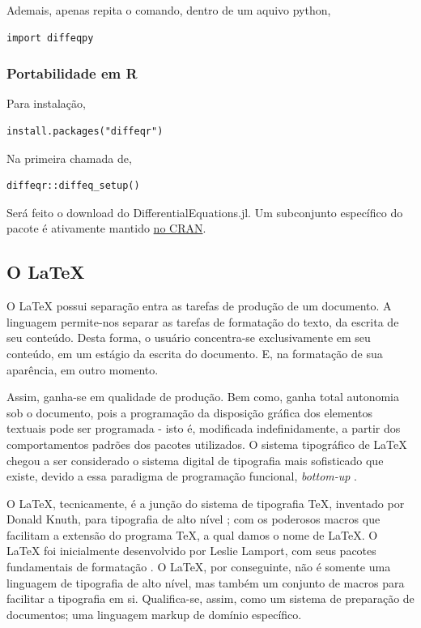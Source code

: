 \documentclass[
12pt,				%
openright,			%
oneside,			%
a4paper,			%
english,			%
french,				%
spanish,			%
brazil,				%
]{abntex2}
\begin{document}
Ademais, apenas repita o comando, dentro de um aquivo python,

\begin{verbatim}
import diffeqpy
\end{verbatim}

\subsubsection{Portabilidade em R}

Para instalação,
\begin{verbatim}
install.packages("diffeqr")
\end{verbatim}

Na primeira chamada de,
\begin{verbatim}
diffeqr::diffeq_setup()
\end{verbatim}

Será feito o download do DifferentialEquations.jl. Um subconjunto específico do pacote é ativamente mantido \href{https://cran.r-project.org/web/packages/diffeqr/index.html}{no CRAN}.

\subsection{O \LaTeX}

O \LaTeX{} possui separação entra as tarefas de produção de um
documento. A linguagem permite-nos separar as tarefas de formatação do texto, da escrita de seu conteúdo. Desta forma, o usuário concentra-se
exclusivamente em seu conteúdo, em um estágio da escrita do documento. E, na formatação de sua aparência, em outro momento.

Assim, ganha-se em qualidade de produção. Bem como, ganha total autonomia sob o documento, pois a programação da disposição gráfica dos elementos textuais pode ser programada - isto é, modificada indefinidamente, a partir dos comportamentos padrões dos pacotes utilizados. O sistema tipográfico de \LaTeX{} chegou a ser considerado o sistema digital de
tipografia mais sofisticado que existe, devido a essa paradigma de
programação funcional, \textit{bottom-up} \cite{haralambous2007}.

O \LaTeX, tecnicamente, é a junção do sistema de tipografia \TeX,
inventado por Donald Knuth, para tipografia de alto nível
\cite{knuth1986}; com os poderosos macros que facilitam a extensão do programa \TeX, a qual damos o nome de
\LaTeX. O \LaTeX{} foi inicialmente desenvolvido por Leslie Lamport, com
seus pacotes fundamentais de formatação \cite{lamport1994}. O \LaTeX,
por conseguinte, não é somente uma linguagem de tipografia de alto
nível, mas também um conjunto de macros para facilitar a tipografia em
si. Qualifica-se, assim, como um sistema de preparação de documentos;
uma linguagem markup de domínio específico.
\end{document}
